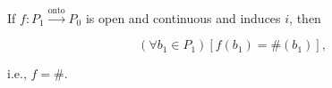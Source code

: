 If $f: P_1 \xrightarrow{\text{onto}} P_0$ is open and continuous and induces $i$, then

$$(\forall b_1 \in P_1)[f(b_1) = \#(b_1)],$$

i.e., $f = \#$.$$
